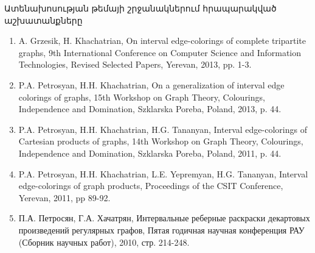 \begin{frame}{Ատենախոսության թեմայի շրջանակներում հրապարակված աշխատանքները}
\begin{enumerate}
\justifying
\fontsize{9pt}{10}\selectfont
\conti
\item A. Grzesik, H. Khachatrian, On interval edge-colorings of complete tripartite graphs, 9th International Conference on Computer Science and Information Technologies, Revised Selected Papers, Yerevan, 2013, pp. 1-3.
\item P.A. Petrosyan, H.H. Khachatrian, On a generalization of interval edge colorings of graphs, 15th Workshop on Graph Theory, Colourings, Independence and Domination, Szklarska Poreba, Poland, 2013, p. 44.
\item  P.A. Petrosyan, H.H. Khachatrian, H.G. Tananyan, Interval edge-colorings of Cartesian products of graphs, 14th Workshop on Graph Theory, Colourings, Independence and Domination, Szklarska Poreba, Poland, 2011, p. 44.
\item  P.A. Petrosyan, H.H. Khachatrian, L.E. Yepremyan, H.G. Tananyan, Interval edge-colorings of graph products, Proceedings of the CSIT Conference, Yerevan, 2011, pp 89-92.
\item П.А. Петросян, Г.А. Хачатрян, Интервальные реберные раскраски декартовых произведений регулярных графов, Пятая годичная научная конференция РАУ (Сборник научных работ), 2010, стр. 214-248.

\end{enumerate}
\end{frame}
